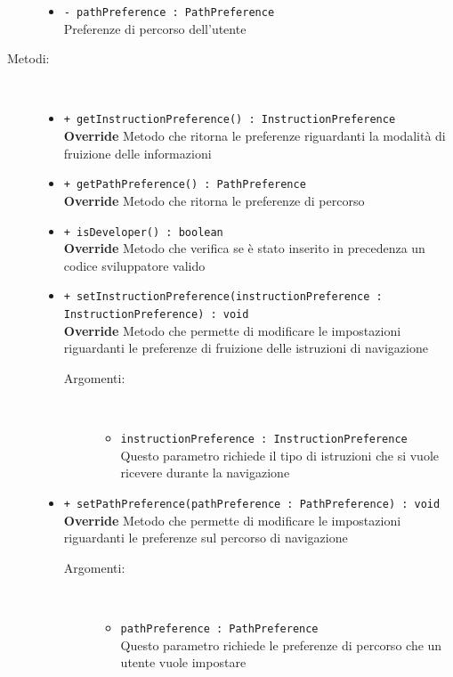 \documentclass[../DefinizioneDiProdotto.tex]{subfiles}
\begin{document}
\begin{description}
\begin{itemize}
\item \texttt{- pathPreference : PathPreference}\\
Preferenze di percorso dell'utente

\end{itemize}
\item[Metodi:] \
\begin{itemize}
\item \texttt{+ getInstructionPreference() : InstructionPreference}\\
\textbf{Override} Metodo che ritorna le preferenze riguardanti la modalità di fruizione delle informazioni
 \item \texttt{+ getPathPreference() : PathPreference}\\
\textbf{Override} Metodo che ritorna le preferenze di percorso
 \item \texttt{+ isDeveloper() : boolean}\\
\textbf{Override} Metodo che verifica se è stato inserito in precedenza un codice sviluppatore valido
 \item \texttt{+ setInstructionPreference(instructionPreference :\\InstructionPreference) : void}\\
\textbf{Override} Metodo che permette di modificare le impostazioni riguardanti le preferenze di fruizione delle istruzioni di navigazione
 \begin{description}
\item[Argomenti:] \
\begin{itemize}
\item \texttt{instructionPreference : InstructionPreference}\\
Questo parametro richiede il tipo di istruzioni che si vuole ricevere durante la navigazione \end{itemize}
\end{description}
\item \texttt{+ setPathPreference(pathPreference : PathPreference) : void}\\
\textbf{Override} Metodo che permette di modificare le impostazioni riguardanti le preferenze sul percorso di navigazione
 \begin{description}
\item[Argomenti:] \
\begin{itemize}
\item \texttt{pathPreference : PathPreference}\\
Questo parametro richiede le preferenze di percorso che un utente vuole impostare\end{itemize}

\end{description}
\end{itemize}
\end{description}
\end{document}
